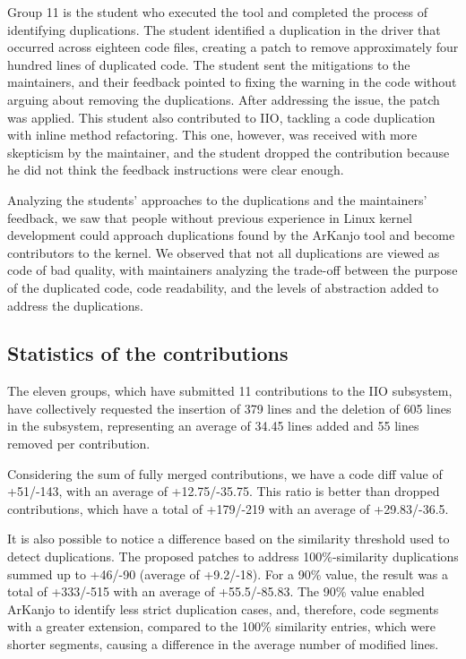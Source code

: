 Group 11 is the student who executed the tool and completed the process of identifying duplications. The student identified a duplication in the driver that occurred across eighteen code files, creating a patch to remove approximately four hundred lines of duplicated code. The student sent the mitigations to the maintainers, and their feedback pointed to fixing the warning in the code without arguing about removing the duplications. After addressing the issue, the patch was applied. This student also contributed to IIO, tackling a code duplication with inline method refactoring. This one, however, was received with more skepticism by the maintainer, and the student dropped the contribution because he did not think the feedback instructions were clear enough.

Analyzing the students' approaches to the duplications and the maintainers' feedback, we saw that people without previous experience in Linux kernel development could approach duplications found by the ArKanjo tool and become contributors to the kernel. We observed that not all duplications are viewed as code of bad quality, with maintainers analyzing the trade-off between the purpose of the duplicated code, code readability, and the levels of abstraction added to address the duplications.

\subsection{Statistics of the contributions}

The eleven groups, which have submitted 11 contributions to the IIO subsystem, have collectively 
requested the insertion of 379 lines and the deletion of 605 lines in the subsystem, 
representing an average of 34.45 lines added and 55 lines removed per contribution.

Considering the sum of fully merged contributions, we have a code diff value of +51/-143, 
with an average of +12.75/-35.75. This ratio is better than dropped contributions, which 
have a total of +179/-219 with an average of +29.83/-36.5.

It is also possible to notice a difference based on the similarity threshold used to 
detect duplications. The proposed patches to address 100\%-similarity duplications 
summed up to +46/-90 (average of +9.2/-18). For a 90\% value, the result was a total 
of +333/-515 with an average of +55.5/-85.83. The 90\% value enabled ArKanjo to identify 
less strict duplication cases, and, therefore, code segments with a greater extension, 
compared to the 100\% similarity entries, which were shorter segments, causing a 
difference in the average number of modified lines.

